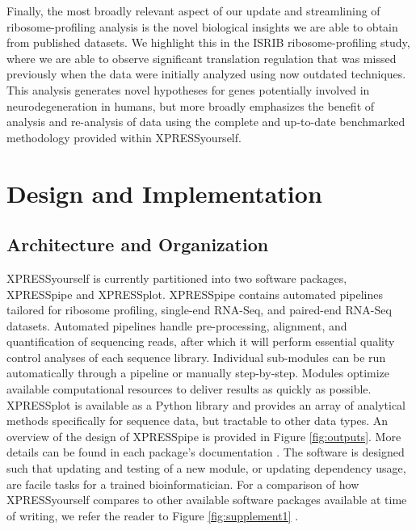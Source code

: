 \documentclass[10pt, oneside]{article}
\begin{document}
Finally, the most broadly relevant aspect of our update and streamlining of ribosome-profiling analysis is the novel biological insights we are able to obtain from published datasets. We highlight this in the ISRIB ribosome-profiling study, where we are able to observe significant translation regulation that was missed previously when the data were initially analyzed using now outdated techniques. This analysis generates novel hypotheses for genes potentially involved in neurodegeneration in humans, but more broadly emphasizes the benefit of analysis and re-analysis of data using the complete and up-to-date benchmarked methodology provided within XPRESSyourself.\\

\section*{Design and Implementation}
\subsection*{Architecture and Organization}
XPRESSyourself is currently partitioned into two software packages, XPRESSpipe and XPRESSplot. XPRESSpipe contains automated pipelines tailored for ribosome profiling, single-end RNA-Seq, and paired-end RNA-Seq datasets. Automated pipelines handle pre-processing, alignment, and quantification of sequencing reads, after which it will perform essential quality control analyses of each sequence library. Individual sub-modules can be run automatically through a pipeline or manually step-by-step. Modules optimize available computational resources to deliver results as quickly as possible. XPRESSplot is available as a Python library and provides an array of analytical methods specifically for sequence data, but tractable to other data types. An overview of the design of XPRESSpipe is provided in Figure \ref{fig:outputs}. More details can be found in each package's documentation \cite{xpresspipe_docs, xpressplot_docs}. The software is designed such that updating and testing of a new module, or updating dependency usage, are facile tasks for a trained bioinformatician. For a comparison of how XPRESSyourself compares to other available software packages available at time of writing, we refer the reader to Figure \ref{fig:supplement1} \cite{galaxy, ribogalaxy, pausepred, anota2seq, riboprofiling, riborex, mqc, shoelaces, supertranscripts, systempiper, orfik, comet_1, comet_2, riboseqr, deeptools, picard, rose, rust, xtail, ribodiff, ribotaper, ribomap_1, ribomap_2, plastid, riboviz, ribostreamr}.\par
\end{document}
